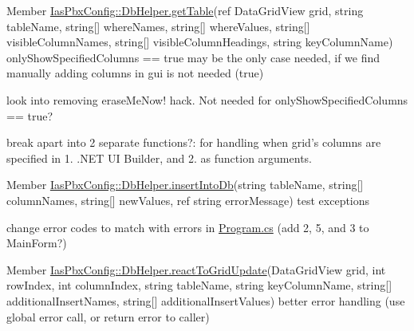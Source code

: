 \label{todo__todo000016}
\hypertarget{todo__todo000016}{}
 
\begin{DoxyDescription}
\item[Member \hyperlink{class_ias_pbx_config_1_1_db_helper_a10079976d673fae758ec466ffcc1ee11}{IasPbxConfig::DbHelper.getTable}(ref DataGridView grid, string tableName, string\mbox{[}\mbox{]} whereNames, string\mbox{[}\mbox{]} whereValues, string\mbox{[}\mbox{]} visibleColumnNames, string\mbox{[}\mbox{]} visibleColumnHeadings, string keyColumnName) ]onlyShowSpecifiedColumns == true may be the only case needed, if we find manually adding columns in gui is not needed (true) 

look into removing eraseMeNow! hack. Not needed for onlyShowSpecifiedColumns == true? 

break apart into 2 separate functions?: for handling when grid's columns are specified in 1. .NET UI Builder, and 2. as function arguments. 
\end{DoxyDescription}

\label{todo__todo000020}
\hypertarget{todo__todo000020}{}
 
\begin{DoxyDescription}
\item[Member \hyperlink{class_ias_pbx_config_1_1_db_helper_ae39e091f5a141a7b43c8baca1ec520f2}{IasPbxConfig::DbHelper.insertIntoDb}(string tableName, string\mbox{[}\mbox{]} columnNames, string\mbox{[}\mbox{]} newValues, ref string errorMessage) ]test exceptions 

change error codes to match with errors in \hyperlink{_program_8cs}{Program.cs} (add 2, 5, and 3 to MainForm?) 
\end{DoxyDescription}

\label{todo__todo000026}
\hypertarget{todo__todo000026}{}
 
\begin{DoxyDescription}
\item[Member \hyperlink{class_ias_pbx_config_1_1_db_helper_a2f4f23f5cdabcac3cdda6e7983bc3d49}{IasPbxConfig::DbHelper.reactToGridUpdate}(DataGridView grid, int rowIndex, int columnIndex, string tableName, string keyColumnName, string\mbox{[}\mbox{]} additionalInsertNames, string\mbox{[}\mbox{]} additionalInsertValues) ]better error handling (use global error call, or return error to caller) 
\end{DoxyDescription}

\label{todo__todo000022}
\hypertarget{todo__todo000022}{}
 
